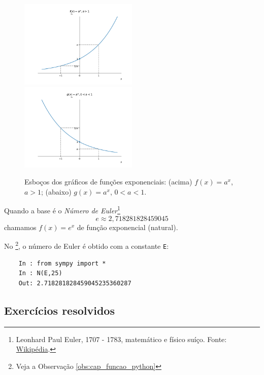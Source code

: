 \begin{figure}[H]
  \centering
  \includegraphics[width=0.5\textwidth]{./cap_funcao/dados/fig_exponencial_graficos/fig_exponencial_2}\\
  \includegraphics[width=0.5\textwidth]{./cap_funcao/dados/fig_exponencial_graficos/fig_exponencial_12}
  \caption{Esboços dos gráficos de funções exponenciais: (acima) $f(x) = a^x$, $a>1$; (abaixo) $g(x) = a^x$, $0<a<1$.}
  \label{fig:exponencial_graficos}
\end{figure}

\begin{obs}
  Quando a base é o \emph{Número de Euler}\footnote{Leonhard Paul Euler, 1707 - 1783, matemático e físico suíço. Fonte: \href{https://pt.wikipedia.org/wiki/Leonhard_Euler}{Wikipédia}.}
  \begin{equation}
    e \approx 2,718281828459045
  \end{equation}
  chamamos $f(x) = e^x$ de função exponencial (natural).

  \ifispython
  No \sympy\footnote{Veja a Observação \ref{obs:cap_funcao_python}}, o número de Euler é obtido com a constante \verb+E+:
  \begin{lstlisting}
    In : from sympy import *
    In : N(E,25)
    Out: 2.718281828459045235360287
  \end{lstlisting}
  \fi
\end{obs}

\subsection*{Exercícios resolvidos}

